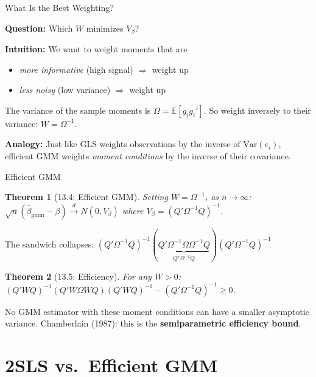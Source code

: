 \documentclass[aspectratio=169, handout, t]{beamer}
\newtheorem{thm}{Theorem}
\numberwithin{equation}{section}
\begin{document}
\begin{frame}{What Is the Best Weighting?}

\textbf{Question:} Which $W$ minimizes $V_\beta$?

\bigskip
\textbf{Intuition:} We want to weight moments that are
\begin{itemize}
\item \textit{more informative} (high signal) $\Rightarrow$ weight up
\item \textit{less noisy} (low variance) $\Rightarrow$ weight up
\end{itemize}

\bigskip
The variance of the sample moments is $\Omega = \mathbb{E}[g_ig_i']$. So \alert{weight inversely to their variance}: $W = \Omega^{-1}$.

\bigskip
\textbf{Analogy:} Just like GLS weights observations by the inverse of $\text{Var}(e_i)$, efficient GMM weights \textit{moment conditions} by the inverse of their covariance.

\end{frame}

\begin{frame}{Efficient GMM}

\begin{thm}[13.4: Efficient GMM]
Setting $W = \Omega^{-1}$, as $n\to\infty$:
$\sqrt{n}(\hat\beta_{\text{gmm}} - \beta) \xrightarrow{d} N(0, V_\beta)$ where $V_\beta = (Q'\Omega^{-1}Q)^{-1}$.
\end{thm}

The sandwich \alert{collapses}: $(Q'\Omega^{-1}Q)^{-1}(\underbrace{Q'\Omega^{-1}\Omega \Omega^{-1}Q}_{Q'\Omega^{-1}Q})(Q'\Omega^{-1}Q)^{-1}$

\begin{thm}[13.5: Efficiency]
For any $W > 0$:
$(Q'WQ)^{-1}(Q'W\Omega WQ)(Q'WQ)^{-1} - (Q'\Omega^{-1}Q)^{-1} \geq 0$.
\end{thm}

No GMM estimator with these moment conditions can have a smaller asymptotic variance.  Chamberlain (1987): this is the \textbf{semiparametric efficiency bound}.

\end{frame}

\section{2SLS vs.\ Efficient GMM}
\end{document}
